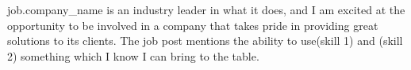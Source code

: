 {{job.company_name}} is an industry leader in what it does, and I am excited at the opportunity to be involved in a company that takes pride in providing great solutions to its clients. The job post mentions the ability to use(skill 1) and (skill 2) something which I know I can bring to the table.

